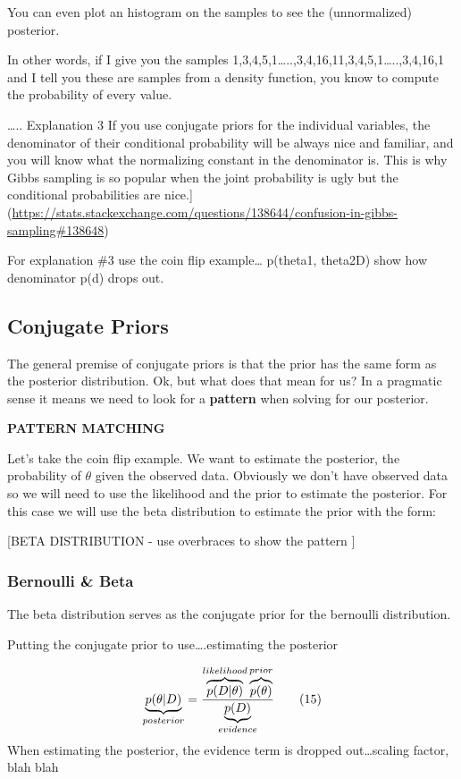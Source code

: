 \documentclass[]{book}
\theoremstyle{definition}
\theoremstyle{definition}
\theoremstyle{definition}
\theoremstyle{remark}
\begin{document}
You can even plot an histogram on the samples to see the (unnormalized)
posterior.

In other words, if I give you the samples
1,3,4,5,1\ldots{}..,3,4,16,11,3,4,5,1\ldots{}..,3,4,16,1 and I tell you
these are samples from a density function, you know to compute the
probability of every value.

\ldots{}.. Explanation 3 If you use conjugate priors for the individual
variables, the denominator of their conditional probability will be
always nice and familiar, and you will know what the normalizing
constant in the denominator is. This is why Gibbs sampling is so popular
when the joint probability is ugly but the conditional probabilities are
nice.{]}(\url{https://stats.stackexchange.com/questions/138644/confusion-in-gibbs-sampling\#138648})

For explanation \#3 use the coin flip example\ldots{} p(theta1,
theta2\textbar{}D) show how denominator p(d) drops out.

\subsection{Conjugate Priors}\label{conjugate-priors}

The general premise of conjugate priors is that the prior has the same
form as the posterior distribution. Ok, but what does that mean for us?
In a pragmatic sense it means we need to look for a \textbf{pattern}
when solving for our posterior.

\textbf{PATTERN MATCHING}

Let's take the coin flip example. We want to estimate the posterior, the
probability of \(\theta\) given the observed data. Obviously we don't
have observed data so we will need to use the likelihood and the prior
to estimate the posterior. For this case we will use the beta
distribution to estimate the prior with the form:

{[}BETA DISTRIBUTION - use overbraces to show the pattern {]}

\subsubsection{Bernoulli \& Beta}\label{bernoulli-beta}

The beta distribution serves as the conjugate prior for the bernoulli
distribution.

Putting the conjugate prior to use\ldots{}.estimating the posterior

\[
\underbrace{p(\theta|D)}_{posterior} = {\overbrace{p(D|\theta)}^{likelihood}
  \overbrace{p(\theta)}^{prior} \over \underbrace{p(D)}_{evidence}}
\tag{15}
\] When estimating the posterior, the evidence term is dropped
out\ldots{}scaling factor, blah blah
\end{document}
